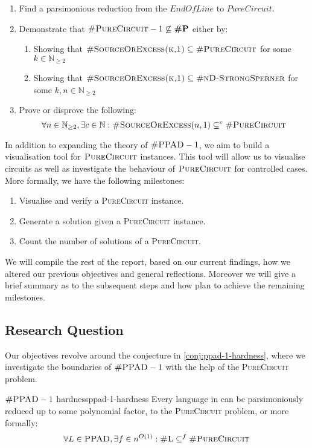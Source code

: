 \begin{enumerate}[label*=R.\arabic*)]
    \item Find a parsimonious reduction from the $\textit{EndOfLine}$ to $\textit{PureCircuit}$.
    \item Demonstrate that $\textsc{\#PureCircuit}- 1 \not\subseteq \textbf{\#P}$ either by:
        \begin{enumerate}
            \item Showing that $\textsc{\#SourceOrExcess(k,1)} \subseteq \textsc{\#PureCircuit}$ for some $k \in \mathbb{N}_{\geq 2}$
            \item Showing that $\textsc{\#SourceOrExcess(k,1)} \subseteq \textsc{\#nD-StrongSperner}$ for some $k,n \in \mathbb{N}_{\geq 2}$ 
        \end{enumerate}
    \item Prove or disprove the following:
\[
\forall n \in \mathbb{N}_{\geq 2}, \exists c \in \mathbb{N}:  \textnormal{\textsc{\#SourceOrExcess}}(n, 1) \subseteq^c \textnormal{\textsc{\#PureCircuit}}
\]

\end{enumerate}

In addition to expanding the theory of $\textsc{\#PPAD} -1$, we aim to build
a visualisation tool for $\textsc{PureCircuit}$ instances. This tool
will allow us to visualise circuits as well as investigate the behaviour
of $\textsc{PureCircuit}$ for controlled cases. More formally,
we have the following milestones:

\begin{enumerate}[label=S.\arabic*)]
    \item Visualise and verify a \textsc{PureCircuit} instance.
    \item Generate a solution given a \textsc{PureCircuit} instance.
    \item Count the number of solutions of a  \textsc{PureCircuit}.
\end{enumerate}

We will compile the rest of the report, based on our current findings, how we altered our previous objectives 
and general reflections. Moreover we will give a brief summary as to the subsequent steps
and how plan to achieve the remaining milestones.


\subsection{Research Question}

Our objectives revolve around the conjecture in \ref{conj:ppad-1-hardness}, where
we investigate the boundaries of $\textnormal{\textsc{\#PPAD}}-1$ with the help of the \textsc{PureCircuit} problem.
\begin{conjecturebox}{$\textnormal{\textsc{\#PPAD}}-1$ hardness}{ppad-1-hardness}
    Every language in  can be parsimoniously reduced up to some polynomial factor, to the
    \textsc{PureCircuit} problem, or more formally:
    $$
    \forall L \in \textnormal{\textsc{PPAD}}, \exists f \in n^{O(1)}: 
    \textnormal{\textsc{\#L}} \subseteq^f \textnormal{\textsc{\#PureCircuit}}
    $$
\end{conjecturebox}

